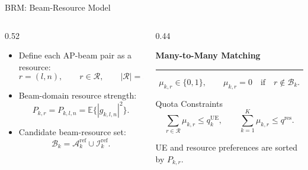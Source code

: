 \documentclass[aspectratio=169, 10pt]{beamer}
\newcommand{\slideheading}[1]{%
    \par\vspace{0.08cm}%
    \settowidth{\dimen0}{\bfseries\large #1}%
    {\bfseries\large #1}%
    \par\vspace{0.015cm}%
    {\color{black}\rule{\dimen0}{0.7pt}}%
    \par\vspace{0.16cm}%
}
\begin{document}
\begin{frame}{BRM: Beam-Resource Model}
    \begin{columns}[T,onlytextwidth]
        \begin{column}{0.52\textwidth}
            \begin{itemize}
                \setlength{\itemsep}{0.8em}
                \item Define each AP-beam pair as a resource:
                \[
                    r=(l,n), \qquad r\in\mathcal{R}, \qquad |\mathcal{R}|=LN.
                \]
                \item Beam-domain resource strength:
                \[
                    P_{k,r}
                    =
                    P_{k,l,n}
                    =
                    \mathbb{E}\{|g_{k,l,n}|^2\}.
                \]
                \item Candidate beam-resource set:
                \[
                    \mathcal{B}_k
                    =
                    \mathcal{A}_k^{\mathrm{ref}}
                    \cup
                    \mathcal{I}_k^{\mathrm{ref}}.
                \]
            \end{itemize}
        \end{column}
        \begin{column}{0.44\textwidth}
            \slideheading{Many-to-Many Matching}
            \[
                \mu_{k,r}\in\{0,1\},
                \qquad
                \mu_{k,r}=0
                \quad
                \text{if}
                \quad
                r\notin\mathcal{B}_k.
            \]
            \begin{block}{Quota Constraints}
                \[
                \sum_{r\in\mathcal{R}}\mu_{k,r}\le q_k^{\mathrm{UE}},
                \qquad
                \sum_{k=1}^{K}\mu_{k,r}\le q^{\mathrm{res}}.
                \]
            \end{block}
            \vspace{-0.05cm}
            UE and resource preferences are sorted by \(P_{k,r}\).
        \end{column}
    \end{columns}
\end{frame}
\end{document}

